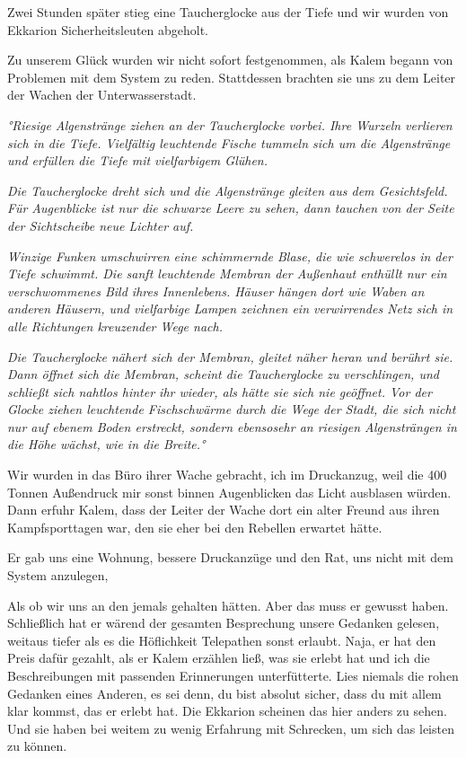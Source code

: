 \documentclass[11pt]{scrartcl}
\begin{document}
Zwei Stunden später stieg eine Taucherglocke aus der Tiefe und wir
wurden von Ekkarion Sicherheitsleuten abgeholt.

Zu unserem Glück wurden wir nicht sofort festgenommen, als Kalem begann
von Problemen mit dem System zu reden. Stattdessen brachten sie uns zu
dem Leiter der Wachen der Unterwasserstadt.

\emph{°Riesige Algenstränge ziehen an der Taucherglocke vorbei. Ihre
Wurzeln verlieren sich in die Tiefe. Vielfältig leuchtende Fische
tummeln sich um die Algenstränge und erfüllen die Tiefe mit vielfarbigem
Glühen.}

\emph{Die Taucherglocke dreht sich und die Algenstränge gleiten aus dem
Gesichtsfeld. Für Augenblicke ist nur die schwarze Leere zu sehen, dann
tauchen von der Seite der Sichtscheibe neue Lichter auf.}

\emph{Winzige Funken umschwirren eine schimmernde Blase, die wie
schwerelos in der Tiefe schwimmt. Die sanft leuchtende Membran der
Außenhaut enthüllt nur ein verschwommenes Bild ihres Innenlebens. Häuser
hängen dort wie Waben an anderen Häusern, und vielfarbige Lampen
zeichnen ein verwirrendes Netz sich in alle Richtungen kreuzender Wege
nach.}

\emph{Die Taucherglocke nähert sich der Membran, gleitet näher heran und
berührt sie. Dann öffnet sich die Membran, scheint die Taucherglocke zu
verschlingen, und schließt sich nahtlos hinter ihr wieder, als hätte sie
sich nie geöffnet. Vor der Glocke ziehen leuchtende Fischschwärme durch
die Wege der Stadt, die sich nicht nur auf ebenem Boden erstreckt,
sondern ebensosehr an riesigen Algensträngen in die Höhe wächst, wie in
die Breite.°}

Wir wurden in das Büro ihrer Wache gebracht, ich im Druckanzug, weil die
400 Tonnen Außendruck mir sonst binnen Augenblicken das Licht ausblasen
würden. Dann erfuhr Kalem, dass der Leiter der Wache dort ein alter
Freund aus ihren Kampfsporttagen war, den sie eher bei den Rebellen
erwartet hätte.

Er gab uns eine Wohnung, bessere Druckanzüge und den Rat, uns nicht mit
dem System anzulegen,

Als ob wir uns an den jemals gehalten hätten. Aber das muss er gewusst
haben. Schließlich hat er wärend der gesamten Besprechung unsere
Gedanken gelesen, weitaus tiefer als es die Höflichkeit Telepathen sonst
erlaubt. Naja, er hat den Preis dafür gezahlt, als er Kalem erzählen
ließ, was sie erlebt hat und ich die Beschreibungen mit passenden
Erinnerungen unterfütterte. Lies niemals die rohen Gedanken eines
Anderen, es sei denn, du bist absolut sicher, dass du mit allem klar
kommst, das er erlebt hat. Die Ekkarion scheinen das hier anders zu
sehen. Und sie haben bei weitem zu wenig Erfahrung mit Schrecken, um
sich das leisten zu können.
\end{document}
